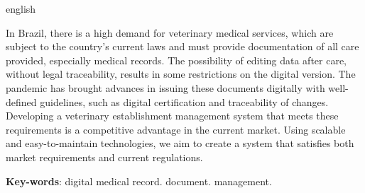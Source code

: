 \documentclass[
    12pt,               %
    openright,          %
    oneside,
    a4paper,            %
    BIBLATEX,           %
    TODO,               %
    english,            %
    brazil              %
    ]{ifsp-spo-inf-ctds}
\begin{document}
\begin{resumo}[Abstract]
 \begin{otherlanguage*}{english}

 In Brazil, there is a high demand for veterinary medical services, which are subject to the country's current laws and must provide documentation of all care provided, especially medical records. The possibility of editing data after care, without legal traceability, results in some restrictions on the digital version. The pandemic has brought advances in issuing these documents digitally with well-defined guidelines, such as digital certification and traceability of changes. Developing a veterinary establishment management system that meets these requirements is a competitive advantage in the current market. Using scalable and easy-to-maintain technologies, we aim to create a system that satisfies both market requirements and current regulations.

   \vspace{\onelineskip}

   \noindent 
   \textbf{Key-words}: digital medical record. document. management. 
 \end{otherlanguage*}
\end{resumo}


\listoffigures*
\cleardoublepage

\listoftables*
\cleardoublepage

\listofquadros*
\cleardoublepage





%




%
\tableofcontents*
\textual
\end{document}
